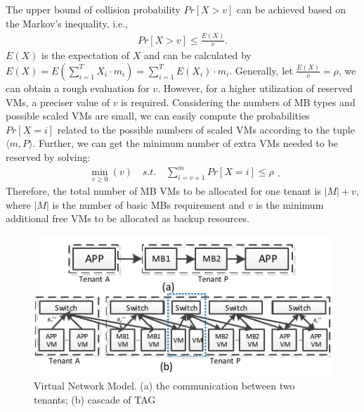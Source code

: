 \documentclass[review]{elsarticle}
\begin{document}
The upper bound of collision probability $Pr\left[X>v\right]$ can be achieved based on the Markov's inequality, i.e.,
\begin{equation}
\begin{aligned} 
Pr\left[X>v\right]\leq \frac{E(X)}{v}.
\end{aligned}
\end{equation} 
$E(X)$ is the expectation of $X$ and can be calculated by $E(X)=E(\sum_{i=1}^{T}X_{i}\cdot m_{i}) = \sum_{i=1}^{T}E(X_i)\cdot m_i$. Generally, let $\frac{E(X)}{v}=\rho$, we can obtain a rough evaluation for $v$.
However, for a higher utilization of reserved VMs, a preciser  value of $v$ is required.
Considering the numbers of MB types and possible scaled VMs are small, we can easily compute the probabilities $Pr\left[X=i\right]$ related to the possible numbers of scaled VMs according to the tuple $\langle m, P \rangle$.
Further, we can get the minimum number of extra VMs needed to be reserved by solving: 
\begin{equation}
\begin{aligned}
\min\limits_{v\geq 0}(v) \quad s.t. \quad \sum_{i=v+1}^{m}Pr\left[X=i \right] \leq \rho
\end{aligned} .
\end{equation}
Therefore, the total number of MB VMs to be allocated for one tenant is $|M|+v$, where $|M|$ is the number of basic MBs requirement and $v$ is the minimum additional free VMs to be allocated as backup resources. %

\begin{figure}
	\centering
	\includegraphics[width=3.3 in]{fig/scalability.pdf}
	\caption{Virtual Network Model. (a) the communication between two tenants; (b) cascade of TAG}
	\label{fig:scalability}
\end{figure}
\end{document}
